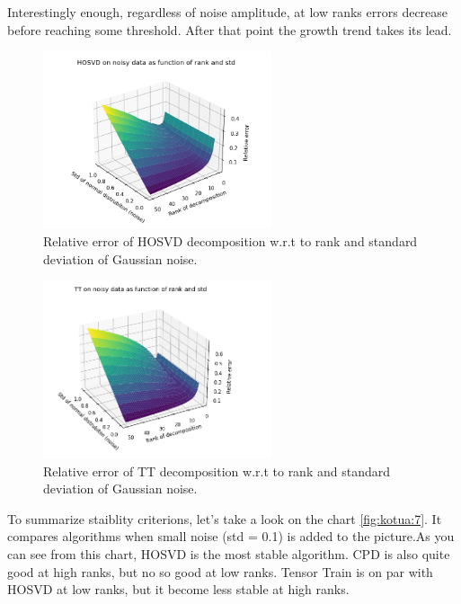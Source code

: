 \documentclass[../../main.tex]{subfiles}
\begin{document}
Interestingly enough, regardless of noise amplitude, at low ranks errors decrease before reaching some threshold. After that point the growth trend takes its lead.

\begin{figure}[h!]
\centering
\includegraphics[width=0.6\textwidth]{figures/hosvd}
\caption{Relative error of HOSVD decomposition w.r.t to rank and standard deviation of Gaussian noise.}
\label{fig:kotua:5}
\end{figure}

\begin{figure}[h!]
\centering
\includegraphics[width=0.6\textwidth]{figures/tt}
\caption{Relative error of TT decomposition w.r.t to rank and standard deviation of Gaussian noise.}
\label{fig:kotua:6}
\end{figure}

To summarize staiblity criterions, let's take a look on the chart \ref{fig:kotua:7}. It compares algorithms when small noise (std = 0.1) is added to the picture.As you can see from this chart, HOSVD is the most stable algorithm. CPD is also quite good at high ranks, but no so good at low ranks. Tensor Train is on par with HOSVD at low ranks, but it become less stable at high ranks.  
\end{document}

